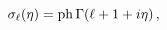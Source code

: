 \[\mathop{{\sigma_{\ell}}\/}\nolimits\!\left(\eta\right)=\mathop{\mathrm{ph}\/}%
\nolimits\mathop{\Gamma\/}\nolimits\!\left(\ell+1+i\eta\right),\]